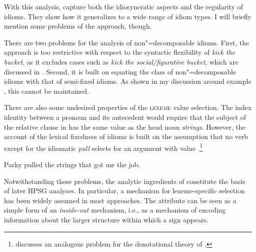 \documentclass[output=paper,biblatex,babelshorthands,newtxmath,draftmode,colorlinks,citecolor=brown]{langscibook}
\begin{document}
\ea %
\label{ke-kick}
\z 


With this analysis, \citet{KE94a} capture both the idiosyncratic aspects and the regularity of idioms. 
They show how it generalizes to a wide range of idiom types. 
I will briefly mention some problems of the approach, though.

There are two problems for the analysis of non"=decomposable idioms.  First, the approach is too
restrictive with respect to the syntactic flexibility of \emph{kick the bucket}, as it excludes
cases such as \emph{kick the social/figurative bucket}, which are discussed in \citet{Ernst:81}.
Second, it is built on equating the class of non"=decomposable idioms with that of semi-fixed
idioms. As shown in my discussion around example , this cannot be maintained.

\largerpage
There are also some undesired properties of the \textsc{lexeme} value selection. The index identity
between a pronoun and its antecedent would require that the subject of the relative
clause in  has the same  value as the head noun
\emph{strings}. However, the account of the lexical fixedness of idioms is built on the assumption
that no verb except for the idiomatic \emph{pull} selects for an argument with  value
.\footnote{\citet{Pulman:93} discusses an analogous problem for the denotational
  theory of \citet{GKPS85a}.}

\ea \label{strings-relcl}
Parky pulled the strings that got me the job.
\citep[137]{McCawley:81}
\z 

Notwithstanding these problems, the analytic ingredients of \citet{KE94a} constitute the basis of
later HPSG analyses. In particular, a mechanism for lexeme-specific selection has been widely
assumed in most approaches. The attribute  can be seen as a simple form of an
\emph{inside-out} mechanism, i.e., as a mechanism of encoding information
about the larger structure within which a sign appears.
%
\end{document}
